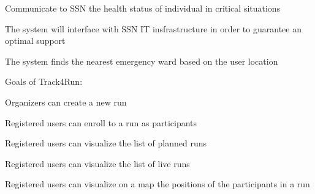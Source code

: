 \begin{goalList}
\begin{enumerate}[label={[}G 2.\arabic*{]}]
\item \label{goal:sos1}Communicate to SSN the health status of individual in critical situations
\item \label{goal:sos2}
The system will interface with SSN IT insfrastructure in order to guarantee an optimal support
\item \label{goal:sos3}The system finds the nearest emergency ward based on the user location

\end{enumerate}

Goals of Track4Run:
\begin{enumerate}[label={[}G 3.\arabic*{]}]

\item \label{goal:run1}
Organizers can create a new run
\item \label{goal:run2}Registered users can enroll to a run as participants
\item \label{goal:run3}Registered users can visualize the list of planned runs

\item\label{goal:run5}Registered users can visualize the list of live runs


\item \label{goal:run4}Registered users can visualize on a map the positions of the participants
in a run


\end{enumerate}
\end{goalList}

